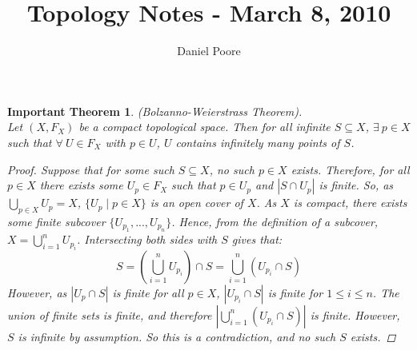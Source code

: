 \documentclass[11pt]{article}
\title{Topology Notes - March 8, 2010}
\author{Daniel Poore}
\date{}                                           %
\newtheorem{theorem}{Important Theorem}
\begin{document}
\maketitle

\begin{theorem}
(Bolzanno-Weierstrass Theorem).
\\
Let $(X,F_X)$ be a compact topological space.  Then for all infinite $S \subseteq X$, $\exists \ p \in X$ such that $\forall \ U \in F_X$ with $p \in U$, $U$ contains infinitely many points of $S$.
\begin{proof}
Suppose that for some such $S \subseteq X$, no such $p \in X$ exists.  Therefore, for all $p \in X$ there exists some $U_p \in F_X$ such that $p \in U_p$ and $|S \cap U_p|$ is finite.  So, as $\displaystyle{\bigcup_{p \in X} U_p = X}$, $\{U_p \mid p \in X\}$ is an open cover of $X$.  As $X$ is compact, there exists some finite subcover $\{U_{p_1},...,U_{p_n}\}$.  Hence, from the definition of a subcover, $\displaystyle{X = \bigcup_{i=1}^n U_{p_i}}$.  Intersecting both sides with $S$ gives that:
$$S = \left(\bigcup_{i=1}^n U_{p_i}\right) \cap S = \bigcup_{i=1}^n (U_{p_i} \cap S)$$
However, as $|U_p \cap S|$ is finite for all $p \in X$, $|U_{p_i} \cap S|$ is finite for $1 \leq i \leq n$.  The union of finite sets is finite, and therefore $\left|\bigcup_{i=1}^n (U_{p_i} \cap S)\right|$ is finite.  However, $S$ is infinite by assumption.  So this is a contradiction, and no such $S$ exists.
\end{proof}
\end{theorem}
\newpage
\end{document}
